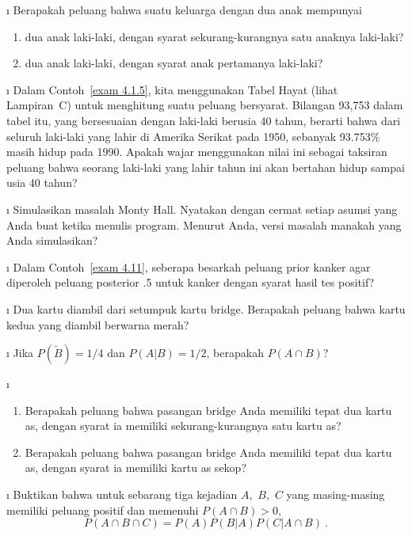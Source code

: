 \begin{LJSItem}
\i\label{exer 4.1.9} Berapakah peluang bahwa suatu keluarga dengan dua anak mempunyai
\begin{enumerate}
\item dua anak laki-laki, dengan syarat sekurang-kurangnya satu anaknya laki-laki?

\item dua anak laki-laki, dengan syarat anak pertamanya laki-laki?
\end{enumerate}

\i\label{exer 4.1.9.5}  Dalam Contoh~\ref{exam 4.1.5}, kita menggunakan Tabel Hayat (lihat Lampiran~C)
untuk menghitung suatu peluang bersyarat.  Bilangan 93{,}753 dalam tabel itu, yang bersesuaian dengan
laki-laki berusia 40 tahun, berarti bahwa dari seluruh laki-laki yang lahir di Amerika Serikat pada 1950, sebanyak 93.753\%
masih hidup pada 1990.  Apakah wajar menggunakan nilai ini sebagai taksiran peluang bahwa seorang laki-laki yang lahir
tahun ini akan bertahan hidup sampai usia 40 tahun? 

\i\label{exer 4.1.9.6} Simulasikan masalah Monty Hall.  Nyatakan dengan cermat setiap asumsi
yang Anda buat ketika menulis program.  Menurut Anda, versi masalah manakah yang
Anda simulasikan?

\i\label{exer 4.1.10} Dalam Contoh~\ref{exam 4.11}, seberapa besarkah peluang prior
kanker agar diperoleh peluang posterior .5 untuk kanker dengan syarat hasil tes
positif?

\i\label{exer 4.1.11} Dua kartu diambil dari setumpuk kartu bridge.  Berapakah peluang bahwa
kartu kedua yang diambil berwarna merah?

\i\label{exer 4.1.12} Jika $P(\tilde B) = 1/4$ dan $P(A|B) = 1/2$, berapakah $P(A \cap B)$?

\i\label{exer 4.1.13}
\begin{enumerate} 
\item Berapakah peluang bahwa pasangan bridge Anda memiliki tepat dua kartu as,
dengan syarat ia memiliki sekurang-kurangnya satu kartu as?

\item Berapakah peluang bahwa pasangan bridge Anda memiliki tepat dua kartu as,
dengan syarat ia memiliki kartu as sekop?
\end{enumerate}

\i\label{exer 4.1.14} Buktikan bahwa untuk sebarang tiga kejadian $A$,~$B$,~$C$ yang masing-masing memiliki
peluang positif dan memenuhi $P(A \cap B) > 0$,
$$
P(A \cap B \cap C) = P(A)P(B|A)P(C|A \cap B)\ .
$$


\end{LJSItem}
